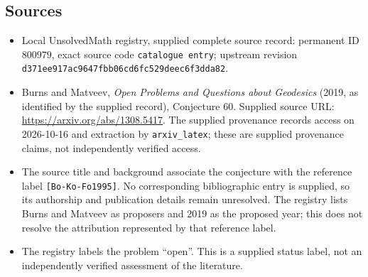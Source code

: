 \documentclass[11pt]{article}
\begin{document}
\subsection{Sources}
\begin{itemize}
\item Local UnsolvedMath registry, supplied complete source record: permanent ID \(800979\), exact source code \texttt{catalogue entry}; upstream revision \texttt{d371ee917ac9647fbb06cd6fc529deec6f3dda82}.
\item Burns and Matveev, \emph{Open Problems and Questions about Geodesics} (2019, as identified by the supplied record), Conjecture 60. Supplied source URL: \url{https://arxiv.org/abs/1308.5417}. The supplied provenance records access on 2026-10-16 and extraction by \texttt{arxiv\_latex}; these are supplied provenance claims, not independently verified access.
\item The source title and background associate the conjecture with the reference label \texttt{[Bo-Ko-Fo1995]}. No corresponding bibliographic entry is supplied, so its authorship and publication details remain unresolved. The registry lists Burns and Matveev as proposers and 2019 as the proposed year; this does not resolve the attribution represented by that reference label.
\item The registry labels the problem ``open''. This is a supplied status label, not an independently verified assessment of the literature.
\end{itemize}
\end{document}
